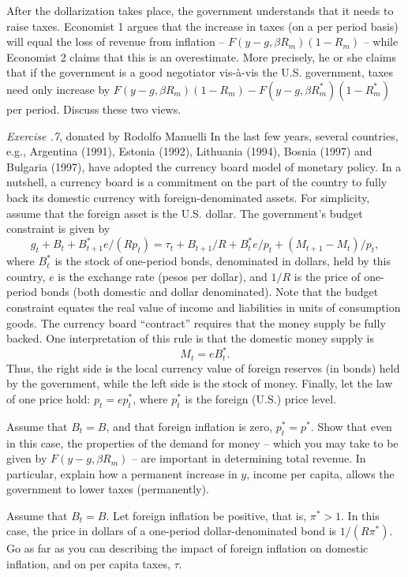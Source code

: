 After the dollarization takes place, the government understands
that it needs to raise taxes.  Economist 1 argues that the increase in taxes
(on a per period basis) will equal the loss of revenue from
inflation -- $F(y-g, \beta R_m)(1-R_m)$ -- while Economist 2 claims that this is an
overestimate.  More precisely, he or she claims that if the government is a
good negotiator vis-\`a-vis the U.S. government, taxes need only increase by
$F(y-g, \beta R_m)(1-R_m) - F(y-g, \beta R_m^*)(1 -R_m^*)$
per period.  Discuss
these two views.


\medskip\noindent
{\it Exercise \the\chapternum.7}, donated by Rodolfo Manuelli
\medskip\noindent
In the last few years, several countries, e.g., Argentina (1991),
Estonia (1992), Lithuania (1994), Bosnia (1997) and Bulgaria (1997),
  have adopted the currency board model of monetary policy.
  In a nutshell, a currency board is a
commitment on the part of the country to fully back its domestic
currency with foreign-denominated assets.  For simplicity,
assume that the foreign asset is the U.S. dollar.
\medskip
The government's budget constraint is given by
$$ g_t + B_t + B^*_{t+1}e/(Rp_t) = \tau_t + B_{t+1}/R + B^*_te/p_t +
(M_{t+1} - M_t)/p_t,  $$
where $B^*_t$ is the stock of one-period bonds, denominated in dollars,
held by this country, $e$ is the exchange rate (pesos per dollar), and
$1/R$ is the price of one-period bonds (both domestic and dollar denominated).
  Note that the budget constraint equates the real value of income and
liabilities in units of consumption goods.
\medskip
The currency board ``contract'' requires that the money supply be fully backed.
One interpretation of this rule is that the domestic money supply is
$$ M_t = eB^*_t.  $$
Thus, the right side is the local currency value of foreign
reserves (in bonds) held by the government, while the left side
is the stock of money.  Finally, let the law of one price hold:
$p_t = ep^*_t$, where $p^*_t$ is the foreign (U.S.) price level.
\medskip


 Assume that $B_t = B$, and that foreign inflation is zero, $p^*_t =
 p^*$.  Show that even in this case, the properties of the demand for
money -- which you may take to be given by $F(y-g, \beta R_m)$ --
 are important in determining total revenue.  In particular,
 explain how a permanent increase in $y$,
income per capita, allows the government to lower taxes (permanently).
\medskip


 Assume that $B_t = B$.  Let foreign inflation be positive,
that is,
 $\pi^* > 1$.  In this case, the price in dollars of a one-period
dollar-denominated bond is $1/(R\pi^*)$.  Go as far as you can describing
the impact of foreign inflation on domestic inflation, and on per
capita taxes, $\tau$.
\medskip


